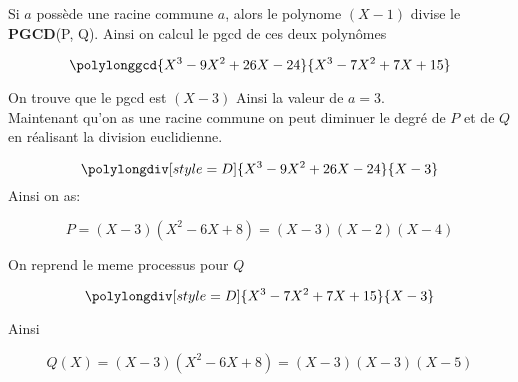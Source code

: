 \documentclass{report}
\begin{document}
\begin{myproof}

  Si $a$ possède une racine commune  $a$, alors le polynome $(X-1)$ divise le \textbf{PGCD}(P, Q). Ainsi on calcul le pgcd de ces deux polynômes

$$
\polylonggcd{X^3 - 9X^2 + 26X  - 24}{X^3 - 7X^2 + 7X + 15}
$$

On trouve que le pgcd est $(X-3)$ Ainsi la valeur de $a=3$.\\

Maintenant qu'on as une racine commune on peut diminuer le degré de $P$ et de $Q$ en réalisant la division euclidienne.

$$
\polylongdiv[style=D]{X^3 - 9X^2 + 26 X -24}{X-3}
$$
Ainsi on as:

$$
P = (X-3)(X^2-6X+8) = (X-3)(X-2)(X-4)
$$

On reprend le meme processus pour $Q$

$$
\polylongdiv[style=D]{X^3-7X^2 + 7X + 15}{X-3}
$$

Ainsi 

$$
Q(X) = (X-3)(X^2-6X+8) = (X-3)(X-3)(X-5)
$$



\end{myproof}

\end{document}
